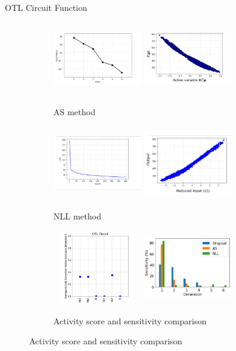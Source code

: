 \documentclass[10pt]{beamer}
\begin{document}
\begin{frame}{OTL Circuit Function}
\begin{figure}
\begin{subfigure}{0.3\textwidth}
    \includegraphics[height=1.25in,width=1.5in]{images/circuiteigen.png}
    \includegraphics[height=1.25in,width=1.5in]{images/circuitas.png}
    \caption{AS method}
\end{subfigure}
\hfill
\begin{subfigure}{0.3\textwidth}
    \includegraphics[height=1.25in,width=1.5in]{images/circuitloss.png}
    \includegraphics[height=1.25in,width=1.5in]{images/newcircuitnll.png}
    \caption{NLL method}
\end{subfigure}
\hfill
\begin{subfigure}{0.3\textwidth}
    \includegraphics[height=1.25in,width=1.5in]{images/OTLEC2.png}
    \includegraphics[height=1.25in,width=1.5in]{images/circuit sens.png}
    \captionsetup{justification=centering}
    \caption{Activity score and sensitivity comparison}
\end{subfigure}
\end{figure}
\end{frame}
\end{document}

